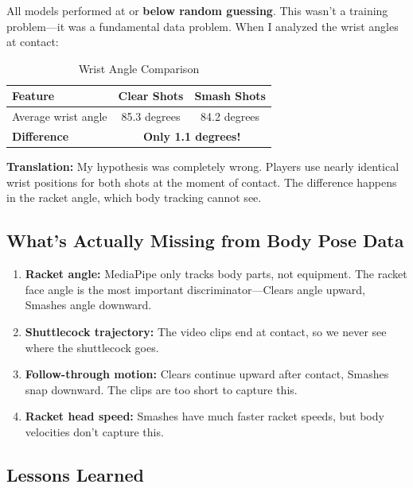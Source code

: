 \documentclass[11pt,a4paper]{article}
\begin{document}
All models performed at or \textbf{below random guessing}. This wasn't a training problem---it was a fundamental data problem. When I analyzed the wrist angles at contact:

\begin{table}[H]
\centering
\caption{Wrist Angle Comparison}
\begin{tabular}{lcc}
\toprule
\textbf{Feature} & \textbf{Clear Shots} & \textbf{Smash Shots} \\
\midrule
Average wrist angle & 85.3 degrees & 84.2 degrees \\
\textbf{Difference} & \multicolumn{2}{c}{\textbf{Only 1.1 degrees!}} \\
\bottomrule
\end{tabular}
\end{table}

\textbf{Translation:} My hypothesis was completely wrong. Players use nearly identical wrist positions for both shots at the moment of contact. The difference happens in the racket angle, which body tracking cannot see.

\subsection{What's Actually Missing from Body Pose Data}

\begin{enumerate}
\item \textbf{Racket angle:} MediaPipe only tracks body parts, not equipment. The racket face angle is the most important discriminator---Clears angle upward, Smashes angle downward.

\item \textbf{Shuttlecock trajectory:} The video clips end at contact, so we never see where the shuttlecock goes.

\item \textbf{Follow-through motion:} Clears continue upward after contact, Smashes snap downward. The clips are too short to capture this.

\item \textbf{Racket head speed:} Smashes have much faster racket speeds, but body velocities don't capture this.
\end{enumerate}

\subsection{Lessons Learned}
\end{document}
